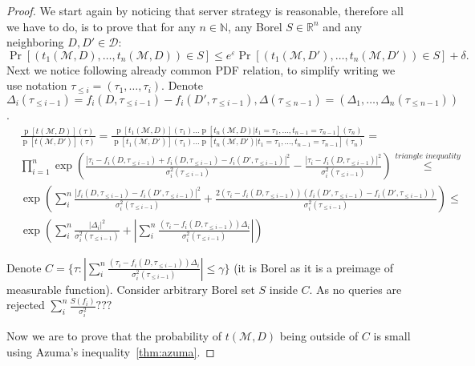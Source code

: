 \documentclass[12pt,letterpaper]{article}
\newcommand{\R}{\mathbb{R}}
\newcommand{\N}{\mathbb{N}}
\let\eps\varepsilon
\newcommand{\p}{\operatorname{p}}
\begin{document}
\begin{proof}
We start again by noticing that server strategy is reasonable, therefore all we have to do, is to prove that for any $n \in \N$, any Borel $S \in \R^{n}$ and any neighboring $D, D' \in \mathcal{D}$:
 $$\Pr[(t_1(\mathcal{M}, D), \ldots, t_n(\mathcal{M}, D)) \in S] \leq e^{\eps}\Pr[(t_1(\mathcal{M}, D'), \ldots, t_n(\mathcal{M}, D')) \in S] + \delta.$$
 Next we notice following already common PDF relation, to simplify writing we use notation $\tau_{\leq i} = (\tau_1, \ldots, \tau_{i})$. Denote $\Delta_i(\tau_{\leq i - 1}) = f_i(D, \tau_{\leq i - 1}) - f_i(D', \tau_{\leq i - 1}), \Delta(\tau_{\leq n - 1}) = (\Delta_{1}, \ldots, \Delta_n(\tau_{\leq n - 1}))$.
 \begin{align*}
&\frac{\p[t(\mathcal{M}, D)](\tau)}{\p[t(\mathcal{M}, D')](\tau)} =
\frac{\p[t_1(\mathcal{M}, D)](\tau_1)  \ldots  \p[t_n(\mathcal{M}, D) | t_1=\tau_1, \ldots, t_{n - 1}=\tau_{n - 1}](\tau_n)}{\p[t_1(\mathcal{M}, D')](\tau_1)  \ldots  \p[t_n(\mathcal{M}, D') | t_1=\tau_1, \ldots, t_{n - 1}=\tau_{n - 1}](\tau_n)} = \\
&\prod_{i=1}^{n}\exp\left(\frac{|\tau_i - f_i(D, \tau_{\leq i - 1}) + f_i(D, \tau_{\leq i - 1}) - f_i(D', \tau_{\leq i - 1}) |^2}{\sigma_i^2(\tau_{\leq i - 1})} - \frac{|\tau_i - f_i(D, \tau_{\leq i - 1})|^2}{\sigma_i^2(\tau_{\leq i - 1})}\right) \overset{\textit{triangle inequality}}{\leq} \\
&\exp\left(\sum_{i}^{n}\frac{|f_i(D, \tau_{\leq i - 1}) - f_i(D', \tau_{\leq i - 1})|^2}{\sigma_i^2(\tau_{\leq i - 1})} + \frac{2(\tau_i - f_i(D, \tau_{\leq i - 1}))(f_i(D', \tau_{\leq i - 1}) - f_i(D', \tau_{\leq i - 1}))}{\sigma_i^2(\tau_{\leq i - 1})}\right) \leq \\
&\exp\left(\sum_{i}^n\frac{|\Delta_i|^2}{\sigma^2_i(\tau_{\leq i - 1})} + \left|\sum_{i}^n\frac{(\tau_i - f_i(D, \tau_{\leq i - 1}))\Delta_i}{\sigma^2_i(\tau_{\leq i - 1})}\right|\right)
\end{align*}

Denote $C = \{\tau : \left|\sum_{i}^n\frac{(\tau_i - f_i(D, \tau_{\leq i - 1}))\Delta_i}{\sigma^2_i(\tau_{\leq i - 1})}\right| \leq \gamma\}$ (it is Borel as it is a preimage of measurable function).
Consider arbitrary Borel set $S$ inside $C$. As no queries are rejected $\sum_{i}^{n}\frac{S(f_i)}{\sigma_i^2} ???$

Now we are to prove that the probability of $t(\mathcal{M}, D)$ being outside of $C$ is small using Azuma's inequality~\ref{thm:azuma}.


\end{proof}
\end{document}
